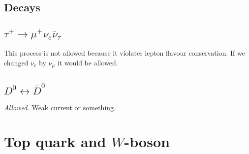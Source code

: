 \documentclass[11pt]{article}
\begin{document}
\begin{multicols}{2}
\subsection*{Decays}

\subsection{$\tau^+ \rightarrow \mu^+ \nu_e \bar{\nu}_{\tau}$}
\begin{flushleft}
This process is not allowed because it violates lepton flavour conservation. If we changed $\nu_e$ by $\nu_{\mu}$ it would be allowed.
\end{flushleft}

\subsection{$D^0 \leftrightarrow \bar{D}^0$}
\textit{Allowed.} Weak current or something.

\pagebreak




\section{Top quark and $W$-boson}


\end{multicols}
\end{document}
